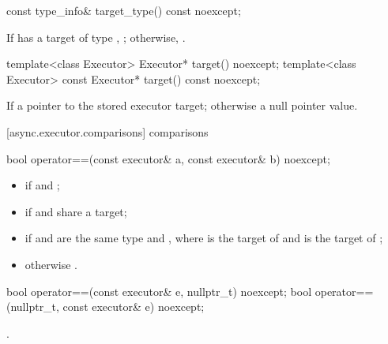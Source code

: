 %
\begin{itemdecl}
const type_info& target_type() const noexcept;
\end{itemdecl}

\begin{itemdescr}
\pnum
\returns If  has a target of type , ; otherwise, .
\end{itemdescr}

%
\begin{itemdecl}
template<class Executor> Executor* target() noexcept;
template<class Executor> const Executor* target() const noexcept;
\end{itemdecl}

\begin{itemdescr}
\pnum
\returns If  a pointer to the stored executor target; otherwise a null pointer value.
\end{itemdescr}



[async.executor.comparisons]{ comparisons}

%
\begin{itemdecl}
bool operator==(const executor& a, const executor& b) noexcept;
\end{itemdecl}

\begin{itemdescr}
\pnum
\returns
\begin{itemize}
\item
{} if  and ;
\item
{} if  and  share a target;
\item
{} if  and  are the same type and , where  is the target of  and  is the target of ;
\item
 otherwise .
\end{itemize}
\end{itemdescr}

%
\begin{itemdecl}
bool operator==(const executor& e, nullptr_t) noexcept;
bool operator==(nullptr_t, const executor& e) noexcept;
\end{itemdecl}

\begin{itemdescr}
\pnum
\returns {}.
\end{itemdescr}

